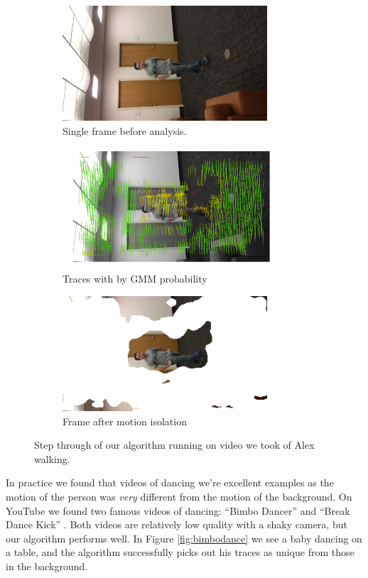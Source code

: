 \begin{figure}[tb]
	\centering
	\begin{subfigure}[b]{0.33\textwidth}
		\centering
		\includegraphics[width=3in,angle=-90]{figs/alex-image30.jpg}
		\caption{Single frame before analysis.}
	\end{subfigure}%
	\begin{subfigure}[b]{0.33\textwidth}
		\centering
		\includegraphics[width=3.2in,angle=-90]{figs/gmm-motion.png}
		\caption{Traces with by GMM probability}
	\end{subfigure}%
	\begin{subfigure}[b]{0.33\textwidth}
		\centering
		\includegraphics[width=3in,angle=-90]{figs/alex30.png}
		\caption{Frame after motion isolation}
	\end{subfigure}%

	\caption{Step through of our algorithm running on video we took of Alex walking.}
	\label{fig:alex-walking}
\end{figure}

In practice we found that videos of dancing we're excellent examples as the
motion of the person was {\it very} different from the motion of the
background.  On YouTube we found two famous videos of dancing: ``Bimbo Dancer''
\cite{bimbodance} and ``Break Dance Kick'' \cite{breakdance}.  Both videos are
relatively low quality with a shaky camera, but our algorithm performs well.
In Figure \ref{fig:bimbodance} we see a baby dancing on a table, and the
algorithm successfully picks out his traces as unique from those in the
background.

